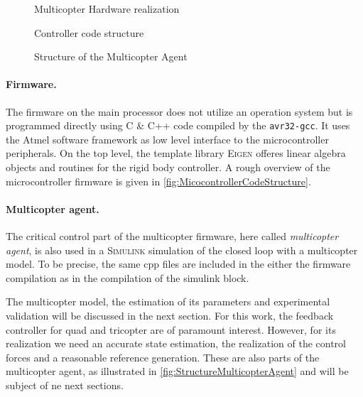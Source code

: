 \begin{figure}[p]
 \centering
 \footnotesize
 \newcommand{\macGroundstation}{\textcolor{white}{\textbf{Groundstation} (Win7 PC)}}
 \newcommand{\macMulticopterRealization}{\textcolor{white}{\textbf{Multicopter}}}
 \newcommand{\macRBSI}{\textcolor{white}{\textbf{rigid}}}
 \newcommand{\macRBSII}{\textcolor{white}{\textbf{body}}}
 \newcommand{\macRBSIII}{\textcolor{white}{\textbf{system}}}
 \newcommand{\macMCI}{\textcolor{white}{\textbf{main}}}
 \newcommand{\macMCII}{\textcolor{white}{\textbf{controller}}}
 
 \caption{Multicopter Hardware realization}
 \label{fig:MulticopterRealizationOverview}
\vspace{5mm}
 
 \caption{Controller code structure}
 \label{fig:MicocontrollerCodeStructure}
\vspace{5mm}
 \footnotesize
 
 \caption{Structure of the Multicopter Agent}
 \label{fig:StructureMulticopterAgent}
\end{figure}


\paragraph{Firmware.}
The firmware on the main processor does not utilize an operation system but is programmed directly using C \& C++ code compiled by the \texttt{avr32-gcc}.
It uses the Atmel software framework as low level interface to the microcontroller peripherals.
On the top level, the template library \textsc{Eigen} offeres linear algebra objects and routines for the rigid body controller.
A rough overview of the microcontroller firmware is given in \autoref{fig:MicocontrollerCodeStructure}.

\paragraph{Multicopter agent.}
The critical control part of the multicopter firmware, here called \textit{multicopter agent}, is also used in a \textsc{Simulink} simulation of the closed loop with a multicopter model.
To be precise, the same cpp files are included in the either the firmware compilation as in the compilation of the simulink block. 

The multicopter model, the estimation of its parameters and experimental validation will be discussed in the next section.
For this work, the feedback controller for quad and tricopter are of paramount interest.
However, for its realization we need an accurate state estimation, the realization of the control forces and a reasonable reference generation.
These are also parts of the multicopter agent, as illustrated in \autoref{fig:StructureMulticopterAgent} and will be subject of ne next sections.
